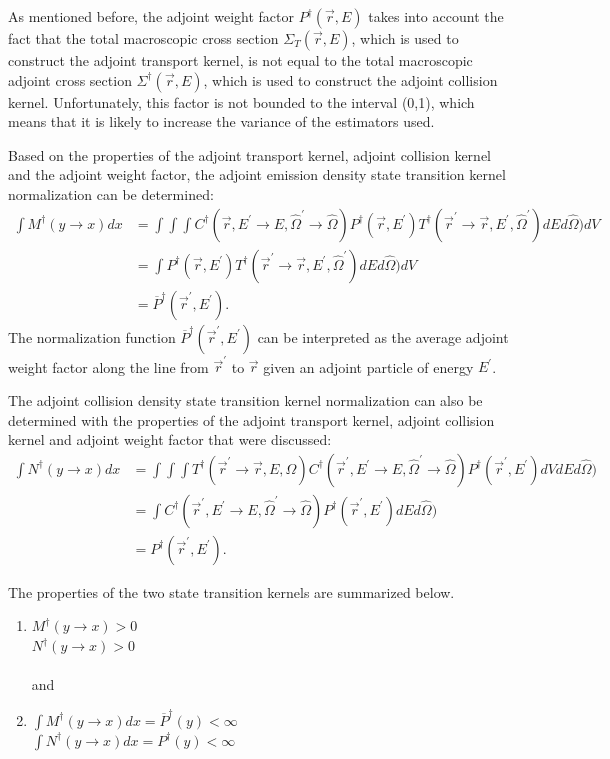 As mentioned before, the adjoint weight factor $P^{\dagger}(\vec{r},E)$ takes 
into account the fact that the total macroscopic cross section 
$\Sigma_T(\vec{r},E)$, which is used to construct the adjoint transport kernel, 
is not equal to the total macroscopic adjoint cross section  
$\Sigma^{\dagger}(\vec{r},E)$, which is used to construct the adjoint collision 
kernel. Unfortunately, this factor is not bounded to the interval (0,1), which 
means that it is likely to increase the variance of the estimators used. 

Based on the properties of the adjoint transport kernel, adjoint collision
kernel and the adjoint weight factor, the adjoint emission density state 
transition kernel normalization can be determined:
\begin{align}
  \int M^{\dagger}(y \to x)dx & = \int\int\int 
  C^{\dagger}(\vec{r},E^{'} \to E,\hat{\Omega}^{'} \to \hat{\Omega})
  P^{\dagger}(\vec{r},E^{'}) 
  T^{\dagger}(\vec{r}^{'} \to \vec{r},E^{'},\hat{\Omega}^{'}) dE d\hat{\Omega}) dV
  \nonumber \\
  & = \int P^{\dagger}(\vec{r},E^{'})
  T^{\dagger}(\vec{r}^{'} \to \vec{r},E^{'},\hat{\Omega}^{'}) dE d\hat{\Omega}) dV
  \nonumber \\
  & = \overline{P}^{\dagger}(\vec{r}^{'},E^{'}).
\end{align}
The normalization function $\overline{P}^{\dagger}(\vec{r}^{'},E^{'})$ can be
interpreted as the average adjoint weight factor along the line from
$\vec{r}^{'}$ to $\vec{r}$ given an adjoint particle of energy $E^{'}$.

The adjoint collision density state transition kernel normalization can also be
determined with the properties of the adjoint transport kernel, adjoint
collision kernel and adjoint weight factor that were discussed:
\begin{align}
  \int N^{\dagger}(y \to x)dx & = \int\int\int
  T^{\dagger}(\vec{r}^{'} \to \vec{r},E,\hat{\Omega})
  C^{\dagger}(\vec{r}^{'},E^{'} \to E,\hat{\Omega}^{'} \to \hat{\Omega})
  P^{\dagger}(\vec{r}^{'},E^{'}) dV dE d\hat{\Omega}) 
  \nonumber \\
  & = \int C^{\dagger}(\vec{r}^{'},E^{'} \to E,\hat{\Omega}^{'} \to \hat{\Omega})
  P^{\dagger}(\vec{r}^{'},E^{'}) dE d\hat{\Omega})
  \nonumber \\
  & = P^{\dagger}(\vec{r}^{'},E^{'}).
\end{align}

The properties of the two state transition kernels are summarized below. 
\begin{enumerate}
  \item $M^{\dagger}(y \to x) > 0$ \\
    $N^{\dagger}(y \to x) > 0$ \\ \\
    and
  \item $\int M^{\dagger}(y \to x)dx = \overline{P}^{\dagger}(y) < \infty$ \\
    $\int N^{\dagger}(y \to x)dx = P^{\dagger}(y) < \infty$
\end{enumerate}

